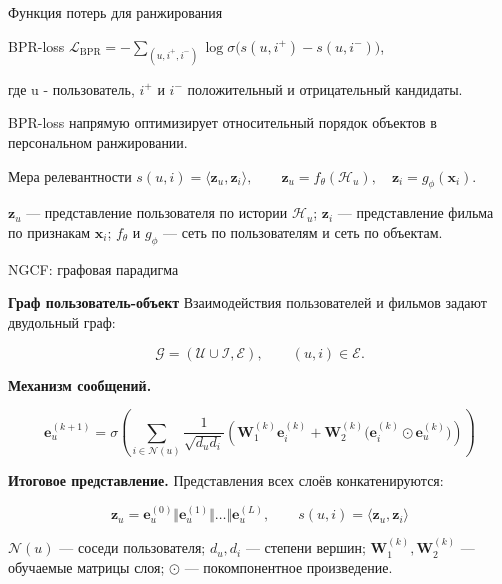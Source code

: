 \documentclass{beamer}
\begin{document}
\begin{frame}{Функция потерь для ранжирования}

\begin{block}{BPR-loss}
$
  \mathcal{L}_{\mathrm{BPR}}
  =
  -\sum_{(u,i^+,i^-)}
  \log \sigma\big(s(u,i^+) - s(u,i^-)\big)
$, 

где u - пользователь, $i^+$ и $i^-$ положительный и отрицательный кандидаты.

\vspace{0.25em}

\footnotesize
BPR-loss напрямую оптимизирует относительный порядок объектов
в персональном ранжировании.
\end{block}

\begin{block}{Мера релевантности}
$
  s(u,i)=\langle \mathbf{z}_u, \mathbf{z}_i \rangle,
  \qquad
  \mathbf{z}_u=f_{\theta}(\mathcal{H}_u),
  \quad
  \mathbf{z}_i=g_{\phi}(\mathbf{x}_i).
$

\vspace{0.25em}

\footnotesize
$\mathbf{z}_u$ — представление пользователя по истории $\mathcal{H}_u$;
$\mathbf{z}_i$ — представление фильма по признакам $\mathbf{x}_i$;
$f_{\theta}$ и $g_{\phi}$ — сеть по пользователям и сеть по объектам.
\end{block}

\end{frame}

\begin{frame}{NGCF: графовая парадигма}

\small

\textbf{Граф пользователь-объект}
Взаимодействия пользователей и фильмов задают двудольный граф:

$$
\mathcal{G}=(\mathcal{U}\cup\mathcal{I},\mathcal{E}),
\qquad
(u,i)\in\mathcal{E}.
$$

\vspace{0.6em}

\textbf{Механизм сообщений.}

$$
\mathbf{e}^{(k+1)}_u =
\sigma\left(
\sum_{i\in\mathcal{N}(u)}
\frac{1}{\sqrt{d_u d_i}}
\left(
\mathbf{W}^{(k)}_1\mathbf{e}^{(k)}_i
+
\mathbf{W}^{(k)}_2
\big(\mathbf{e}^{(k)}_i \odot \mathbf{e}^{(k)}_u\big)
\right)
\right)
$$

\vspace{0.6em}

\textbf{Итоговое представление.}
Представления всех слоёв конкатенируются:

$$
\mathbf{z}_u =
\mathbf{e}^{(0)}_u \Vert \mathbf{e}^{(1)}_u \Vert \ldots \Vert \mathbf{e}^{(L)}_u,
\qquad
s(u,i)=\langle\mathbf{z}_u,\mathbf{z}_i\rangle
$$

\vspace{0.5em}

\footnotesize
$\mathcal{N}(u)$ — соседи пользователя;
$d_u,d_i$ — степени вершин;
$\mathbf{W}^{(k)}_1,\mathbf{W}^{(k)}_2$ — обучаемые матрицы слоя;
$\odot$ — покомпонентное произведение.

\end{frame}
\end{document}
